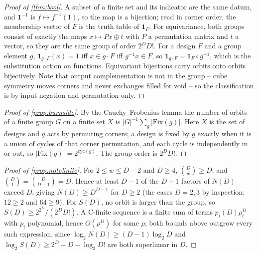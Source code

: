\documentclass[11pt]{amsart}
\theoremstyle{definition}
\theoremstyle{remark}
\begin{document}
\begin{proof}[Proof of \cref{thm:bool}]
A subset of a finite set and its indicator are the same datum, and $\mathbf{1}^{-1}$ is $f \mapsto f^{-1}(1)$, so the map is a bijection; read in corner order, the membership vector of $F$ is the truth table of $\mathbf{1}_{F}$. For equivariance, both groups consist of exactly the maps $x \mapsto Px \oplus t$ with $P$ a permutation matrix and $t$ a vector, so they are the same group of order $2^{D}D!$. For a design $F$ and a group element $g$, $\mathbf{1}_{g\cdot F}(x) = 1$ iff $x \in g\cdot F$ iff $g^{-1}x \in F$, so $\mathbf{1}_{g \cdot F} = \mathbf{1}_{F}\circ g^{-1}$, which is the substitution action on functions. Equivariant bijections carry orbits onto orbits bijectively. Note that output complementation is not in the group -- cube symmetry moves corners and never exchanges filled for void -- so the classification is by input negation and permutation only.
\end{proof}

\begin{proof}[Proof of \cref{prop:burnside}]
By the Cauchy--Frobenius lemma \cite{rotman} the number of orbits of a finite group $G$ on a finite set $X$ is $|G|^{-1}\sum_{g}|\mathrm{Fix}(g)|$. Here $X$ is the set of designs and $g$ acts by permuting corners; a design is fixed by $g$ exactly when it is a union of cycles of that corner permutation, and each cycle is independently in or out, so $|\mathrm{Fix}(g)| = 2^{\mathrm{cyc}(g)}$. The group order is $2^{D}D!$.
\end{proof}

\begin{proof}[Proof of \cref{prop:notcfinite}]
For $2 \le w \le D-2$ and $D \ge 4$, $\binom{D}{w} \ge D$; and $\binom{D}{1} = \binom{D}{D-1} = D$. Hence at least $D-1$ of the $D+1$ factors of $N(D)$ exceed $D$, giving $N(D) \ge D^{D-1}$ for $D \ge 2$ (the cases $D = 2,3$ by inspection: $12 \ge 2$ and $64 \ge 9$). For $S(D)$, no orbit is larger than the group, so $S(D) \ge 2^{2^{D}}/(2^{D}D!)$. A C-finite sequence is a finite sum of terms $p_{i}(D)\rho_{i}^{D}$ with $p_{i}$ polynomial, hence $O(\rho^{D})$ for some $\rho$; both bounds above outgrow every such expression, since $\log_{2}N(D) \ge (D-1)\log_{2}D$ and $\log_{2}S(D) \ge 2^{D}-D-\log_{2}D!$ are both superlinear in $D$.
\end{proof}
\end{document}
